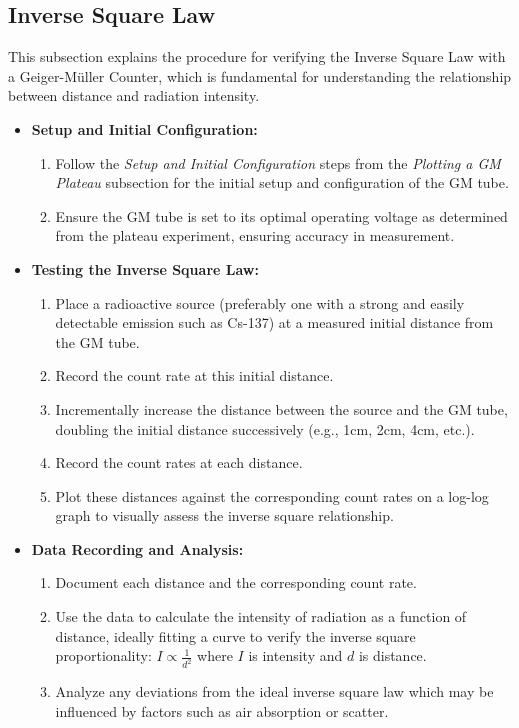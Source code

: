 \documentclass[11pt]{article}
\begin{document}
	\subsection{Inverse Square Law}
	
	This subsection explains the procedure for verifying the Inverse Square Law with a Geiger-Müller Counter, which is fundamental for understanding the relationship between distance and radiation intensity.
	
	\begin{itemize}
		\item \textbf{Setup and Initial Configuration:}
		\begin{enumerate}
			\item Follow the \textit{Setup and Initial Configuration} steps from the \textit{Plotting a GM Plateau} subsection for the initial setup and configuration of the GM tube.
			\item Ensure the GM tube is set to its optimal operating voltage as determined from the plateau experiment, ensuring accuracy in measurement.
		\end{enumerate}
		
		\item \textbf{Testing the Inverse Square Law:}
		\begin{enumerate}
			\item Place a radioactive source (preferably one with a strong and easily detectable emission such as Cs-137) at a measured initial distance from the GM tube.
			\item Record the count rate at this initial distance.
			\item Incrementally increase the distance between the source and the GM tube, doubling the initial distance successively (e.g., 1cm, 2cm, 4cm, etc.).
			\item Record the count rates at each distance.
			\item Plot these distances against the corresponding count rates on a log-log graph to visually assess the inverse square relationship.
		\end{enumerate}
		
		\item \textbf{Data Recording and Analysis:}
		\begin{enumerate}
			\item Document each distance and the corresponding count rate.
			\item Use the data to calculate the intensity of radiation as a function of distance, ideally fitting a curve to verify the inverse square proportionality: \( I \propto \frac{1}{d^2} \) where \( I \) is intensity and \( d \) is distance.
			\item Analyze any deviations from the ideal inverse square law which may be influenced by factors such as air absorption or scatter.
		\end{enumerate}
		

\end{itemize}
\end{document}
